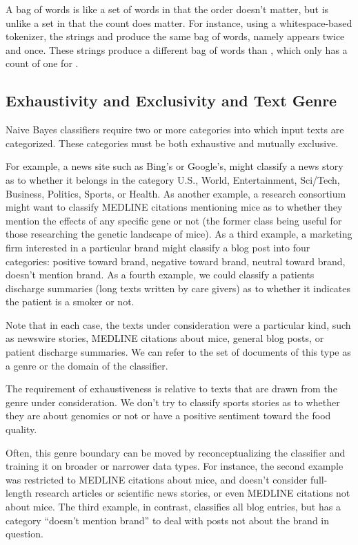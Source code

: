 A bag of words is like a set of words in that the order doesn't
matter, but is unlike a set in that the count does matter.  For
instance, using a whitespace-based tokenizer, the strings
 and  produce
the same bag of words, namely  appears twice and
 once.  These strings produce a different bag of
words than , which only has a count of one for
.


\subsection{Exhaustivity and Exclusivity and Text Genre}

Naive Bayes classifiers require two or more categories into which
input texts are categorized.  These categories must be both exhaustive
and mutually exclusive.

For example, a news site such as Bing's or Google's, might classify a
news story as to whether it belongs in the category U.S., World,
Entertainment, Sci/Tech, Business, Politics, Sports, or Health.  As
another example, a research consortium might want to classify MEDLINE
citations mentioning mice as to whether they mention the effects of
any specific gene or not (the former class being useful for those
researching the genetic landscape of mice).  As a third example, a
marketing firm interested in a particular brand might classify a blog
post into four categories: positive toward brand, negative toward
brand, neutral toward brand, doesn't mention brand.  As a fourth
example, we could classify a patients discharge summaries (long texts
written by care givers) as to whether it indicates the patient is a
smoker or not.

Note that in each case, the texts under consideration were a
particular kind, such as newswire stories, MEDLINE citations about
mice, general blog posts, or patient discharge summaries.  We can
refer to the set of documents of this type as a genre or the domain of
the classifier.

The requirement of exhaustiveness is relative to texts that are drawn
from the genre under consideration.  We don't try to classify sports
stories as to whether they are about genomics or not or have a
positive sentiment toward the food quality.  

Often, this genre boundary can be moved by reconceptualizing the
classifier and training it on broader or narrower data types.  For
instance, the second example was restricted to MEDLINE citations about
mice, and doesn't consider full-length research articles or scientific
news stories, or even MEDLINE citations not about mice.  The third
example, in contrast, classifies all blog entries, but has a category
``doesn't mention brand'' to deal with posts not about the brand in
question.

